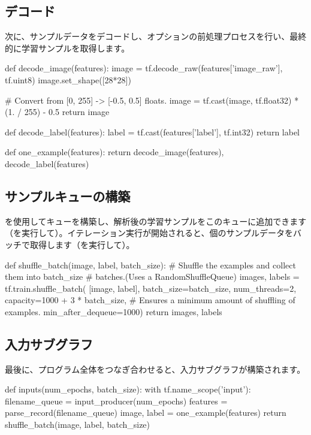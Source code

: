 \begin{content}
\subsection{デコード}

次に、サンプルデータをデコードし、オプションの前処理プロセスを行い、最終的に学習サンプルを取得します。

\begin{leftbar}
\begin{python}
def decode_image(features):
  image = tf.decode_raw(features['image_raw'], tf.uint8)
  image.set_shape([28*28])

  # Convert from [0, 255] -> [-0.5, 0.5] floats.
  image = tf.cast(image, tf.float32) * (1. / 255) - 0.5
  return image

def decode_label(features):
  label = tf.cast(features['label'], tf.int32)
  return label

def one_example(features):
  return decode_image(features), decode_label(features)
\end{python}
\end{leftbar}

\subsection{サンプルキューの構築}

を使用してキューを構築し、解析後の学習サンプルをこのキューに追加できます（を実行して）。イテレーション実行が開始されると、個のサンプルデータをバッチで取得します（を実行して）。


\begin{leftbar}
\begin{python}
def shuffle_batch(image, label, batch_size):
    # Shuffle the examples and collect them into batch\_size
    # batches.(Uses a RandomShuffleQueue)
    images, labels = tf.train.shuffle_batch(
      [image, label], batch_size=batch_size, num_threads=2,
      capacity=1000 + 3 * batch_size,
      # Ensures a minimum amount of shuffling of examples.
      min_after_dequeue=1000)
    return images, labels
\end{python}
\end{leftbar}

\subsection{入力サブグラフ}

最後に、プログラム全体をつなぎ合わせると、入力サブグラフが構築されます。


\begin{leftbar}
\begin{python}
def inputs(num_epochs, batch_size):
  with tf.name_scope('input'):
    filename_queue = input_producer(num_epochs)
    features = parse_record(filename_queue)
    image, label = one_example(features)
    return shuffle_batch(image, label, batch_size)
\end{python}
\end{leftbar}

\end{content}

